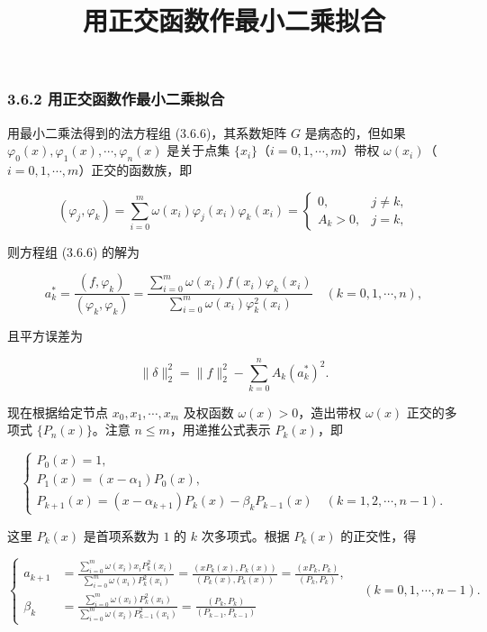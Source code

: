 \documentclass[
  10pt,
  fontset=fandol]{ctexart}
\title{用正交函数作最小二乘拟合}
\author{}
\date{}
\begin{document}
\maketitle

\subsubsection{3.6.2 用正交函数作最小二乘拟合}\label{ux7528ux6b63ux4ea4ux51fdux6570ux4f5cux6700ux5c0fux4e8cux4e58ux62dfux5408}

用最小二乘法得到的法方程组 (3.6.6)，其系数矩阵 \(G\) 是病态的，但如果 \(\varphi_0(x),\varphi_1(x),\cdots,\varphi_n(x)\) 是关于点集 \(\{x_i\}\)（\(i=0,1,\cdots,m\)）带权 \(\omega(x_i)\)（\(i=0,1,\cdots,m\)）正交的函数族，即

\[
(\varphi_j,\varphi_k)=\sum_{i=0}^m\omega(x_i)\varphi_j(x_i)\varphi_k(x_i)=\begin{cases}0,&j\ne k,\\ A_k>0,&j=k,\end{cases}\tag{3.6.8}
\]

则方程组 (3.6.6) 的解为

\[
a_k^*=\frac{(f,\varphi_k)}{(\varphi_k,\varphi_k)}=\frac{\displaystyle\sum_{i=0}^m\omega(x_i)f(x_i)\varphi_k(x_i)}{\displaystyle\sum_{i=0}^m\omega(x_i)\varphi_k^2(x_i)}\quad(k=0,1,\cdots,n),\tag{3.6.9}
\]

且平方误差为

\[
\|\delta\|_2^2=\|f\|_2^2-\sum_{k=0}^n A_k(a_k^*)^2.
\]

现在根据给定节点 \(x_0,x_1,\cdots,x_m\) 及权函数 \(\omega(x)>0\)，造出带权 \(\omega(x)\) 正交的多项式 \(\{P_n(x)\}\)。注意 \(n\leqslant m\)，用递推公式表示 \(P_k(x)\)，即

\[
\begin{cases}
P_0(x)=1,\\
P_1(x)=(x-\alpha_1)P_0(x),\\
P_{k+1}(x)=(x-\alpha_{k+1})P_k(x)-\beta_kP_{k-1}(x)\quad(k=1,2,\cdots,n-1).
\end{cases}\tag{3.6.10}
\]

这里 \(P_k(x)\) 是首项系数为 \(1\) 的 \(k\) 次多项式。根据 \(P_k(x)\) 的正交性，得

\[
\left\{\begin{aligned}
a_{k+1}&=\frac{\displaystyle\sum_{i=0}^m\omega(x_i)x_iP_k^2(x_i)}{\displaystyle\sum_{i=0}^m\omega(x_i)P_k^2(x_i)}=\frac{(xP_k(x),P_k(x))}{(P_k(x),P_k(x))}=\frac{(xP_k,P_k)}{(P_k,P_k)},\\
\beta_k&=\frac{\displaystyle\sum_{i=0}^m\omega(x_i)P_k^2(x_i)}{\displaystyle\sum_{i=0}^m\omega(x_i)P_{k-1}^2(x_i)}=\frac{(P_k,P_k)}{(P_{k-1},P_{k-1})}
\end{aligned}\right.\quad(k=0,1,\cdots,n-1).\tag{3.6.11}
\]
\end{document}
